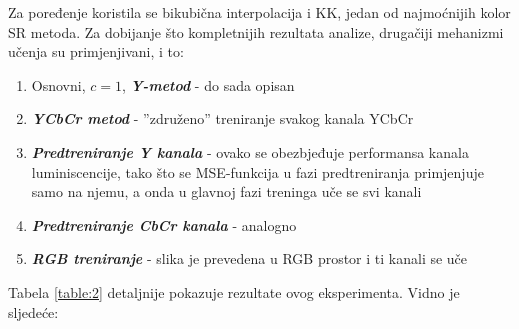 \documentclass[12pt]{report}
\numberwithin{equation}{section}
\begin{document}
  Za poređenje koristila se bikubična interpolacija i KK, jedan od najmoćnijih kolor SR metoda. Za dobijanje što kompletnijih rezultata analize, drugačiji mehanizmi učenja su primjenjivani, i to:
  
  \begin{enumerate}
  
   \item Osnovni, $c=1$, \textit{\textbf{Y-metod}} - do sada opisan
   \item \textit{\textbf{YCbCr metod}} - ''združeno'' treniranje svakog kanala YCbCr
   \item \textit{\textbf{Predtreniranje Y kanala}} - ovako se obezbjeđuje performansa kanala luminiscencije, tako što se MSE-funkcija u fazi predtreniranja primjenjuje samo na njemu, a onda u glavnoj fazi treninga uče se svi kanali  
   \item \textit{\textbf{Predtreniranje CbCr kanala}} - analogno
   \item \textbf{\textit{RGB treniranje}} - slika je prevedena u RGB prostor i ti kanali se uče
   
  \end{enumerate}
     
  
\newpage
 Tabela \ref{table:2} detaljnije pokazuje rezultate ovog eksperimenta. Vidno je sljedeće:
  
\end{document}
